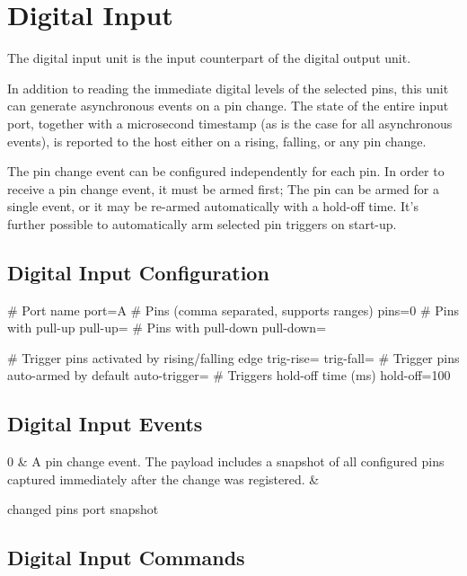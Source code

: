 \section{Digital Input}

The digital input unit is the input counterpart of the digital output unit.

In addition to reading the immediate digital levels of the selected pins, this unit can generate asynchronous events on a pin change. The state of the entire input port, together with a microsecond timestamp (as is the case for all asynchronous events), is reported to the host either on a rising, falling, or any pin change.

The pin change event can be configured independently for each pin. In order to receive a pin change event, it must be armed first; The pin can be armed for a single event, or it may be re-armed automatically with a hold-off time. It's further possible to automatically arm selected pin triggers on start-up.


\subsection{Digital Input Configuration}

\begin{inicode}
[DI:in@2]
# Port name
port=A
# Pins (comma separated, supports ranges)
pins=0
# Pins with pull-up
pull-up=
# Pins with pull-down
pull-down=

# Trigger pins activated by rising/falling edge
trig-rise=
trig-fall=
# Trigger pins auto-armed by default
auto-trigger=
# Triggers hold-off time (ms)
hold-off=100
\end{inicode}

\subsection{Digital Input Events}

\begin{cmdlist}

	0 & 
	A pin change event. The payload includes a snapshot of all configured pins captured immediately after the change was registered.
	& \begin{cmdpld}
		 changed pins
		 port snapshot
	\end{cmdpld}

\end{cmdlist}

\subsection{Digital Input Commands}

